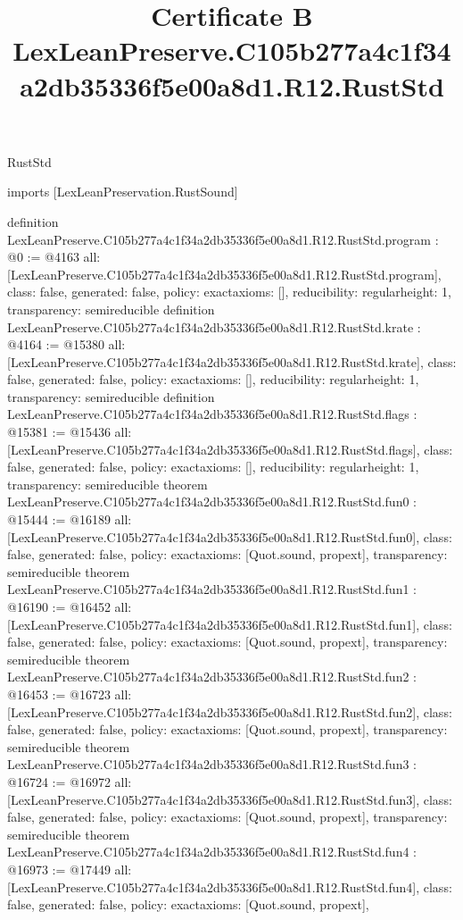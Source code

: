 \begin{lexlean}{RustStd}
\title{Certificate B LexLeanPreserve.C105b277a4c1f34a2db35336f5e00a8d1.R12.RustStd}
\begin{coremodule}
imports [LexLeanPreservation.RustSound]

definition LexLeanPreserve.C105b277a4c1f34a2db35336f5e00a8d1.R12.RustStd.program : @0 := @4163 {
  all: [LexLeanPreserve.C105b277a4c1f34a2db35336f5e00a8d1.R12.RustStd.program],
  class: false,
  generated: false,
  policy: exact{axioms: []},
  reducibility: regular{height: 1},
  transparency: semireducible
}
definition LexLeanPreserve.C105b277a4c1f34a2db35336f5e00a8d1.R12.RustStd.krate : @4164 := @15380 {
  all: [LexLeanPreserve.C105b277a4c1f34a2db35336f5e00a8d1.R12.RustStd.krate],
  class: false,
  generated: false,
  policy: exact{axioms: []},
  reducibility: regular{height: 1},
  transparency: semireducible
}
definition LexLeanPreserve.C105b277a4c1f34a2db35336f5e00a8d1.R12.RustStd.flags : @15381 := @15436 {
  all: [LexLeanPreserve.C105b277a4c1f34a2db35336f5e00a8d1.R12.RustStd.flags],
  class: false,
  generated: false,
  policy: exact{axioms: []},
  reducibility: regular{height: 1},
  transparency: semireducible
}
theorem LexLeanPreserve.C105b277a4c1f34a2db35336f5e00a8d1.R12.RustStd.fun0 : @15444 := @16189 {
  all: [LexLeanPreserve.C105b277a4c1f34a2db35336f5e00a8d1.R12.RustStd.fun0],
  class: false,
  generated: false,
  policy: exact{axioms: [Quot.sound, propext]},
  transparency: semireducible
}
theorem LexLeanPreserve.C105b277a4c1f34a2db35336f5e00a8d1.R12.RustStd.fun1 : @16190 := @16452 {
  all: [LexLeanPreserve.C105b277a4c1f34a2db35336f5e00a8d1.R12.RustStd.fun1],
  class: false,
  generated: false,
  policy: exact{axioms: [Quot.sound, propext]},
  transparency: semireducible
}
theorem LexLeanPreserve.C105b277a4c1f34a2db35336f5e00a8d1.R12.RustStd.fun2 : @16453 := @16723 {
  all: [LexLeanPreserve.C105b277a4c1f34a2db35336f5e00a8d1.R12.RustStd.fun2],
  class: false,
  generated: false,
  policy: exact{axioms: [Quot.sound, propext]},
  transparency: semireducible
}
theorem LexLeanPreserve.C105b277a4c1f34a2db35336f5e00a8d1.R12.RustStd.fun3 : @16724 := @16972 {
  all: [LexLeanPreserve.C105b277a4c1f34a2db35336f5e00a8d1.R12.RustStd.fun3],
  class: false,
  generated: false,
  policy: exact{axioms: [Quot.sound, propext]},
  transparency: semireducible
}
theorem LexLeanPreserve.C105b277a4c1f34a2db35336f5e00a8d1.R12.RustStd.fun4 : @16973 := @17449 {
  all: [LexLeanPreserve.C105b277a4c1f34a2db35336f5e00a8d1.R12.RustStd.fun4],
  class: false,
  generated: false,
  policy: exact{axioms: [Quot.sound, propext]},
}
\end{coremodule}
\end{lexlean}
